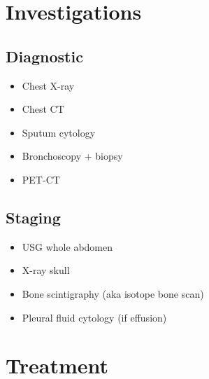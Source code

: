 \documentclass[
  14pt,
]{memoir}
\providecommand{\tightlist}{%
  \setlength{\itemsep}{0pt}\setlength{\parskip}{0pt}}
\begin{document}
\hypertarget{investigations}{%
\section{Investigations}\label{investigations}}

\hypertarget{diagnostic}{%
\subsection{Diagnostic}\label{diagnostic}}

\begin{itemize}
\tightlist
\item
  Chest X-ray
\item
  Chest CT
\item
  Sputum cytology
\item
  Bronchoscopy + biopsy
\item
  PET-CT
\end{itemize}

\hypertarget{staging}{%
\subsection{Staging}\label{staging}}

\begin{itemize}
\tightlist
\item
  USG whole abdomen
\item
  X-ray skull
\item
  Bone scintigraphy (aka isotope bone scan)
\item
  Pleural fluid cytology (if effusion)
\end{itemize}

\hypertarget{treatment}{%
\section{Treatment}\label{treatment}}
\end{document}

